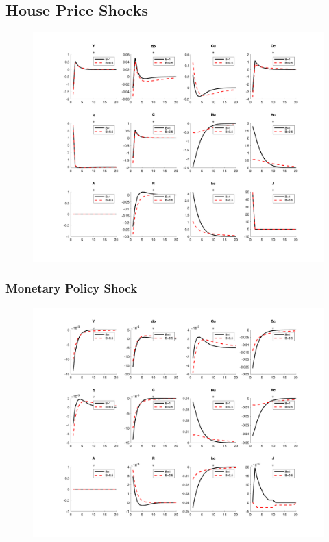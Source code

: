 \documentclass[11pt, a4paper]{article}
\begin{document}
\subsection{House Price Shocks}
\begin{figure}[H]\centering
  \includegraphics[scale=0.5]{../figs/_e}
  \caption{}
\end{figure}

\subsubsection{Monetary Policy Shock}
\begin{figure}[H]\centering
   \includegraphics[scale=0.5]{../figs/_u}
  \caption{}
\end{figure}
\end{document}
